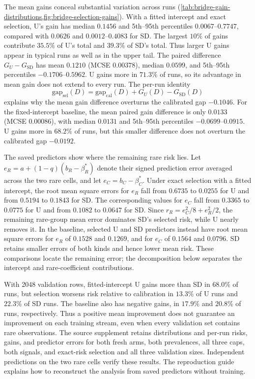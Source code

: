 \documentclass{alt2027}
\begin{document}
The mean gains conceal substantial variation across runs
(\cref{tab:bridge-gain-distributions,fig:bridge-selection-gains}). With a fitted
intercept and exact selection, U's gain has median $0.1456$ and 5th--95th
percentiles $0.0067$--$0.7747$, compared with $0.0626$ and $0.0012$--$0.4083$
for SD. The largest $10\%$ of gains contribute $35.5\%$ of U's total and
$39.3\%$ of SD's total. Thus larger U gains appear in typical runs as well as in
the upper tail. The paired difference $G_U - G_{\mathrm{SD}}$ has mean $0.1210$
(MCSE $0.00378$), median $0.0599$, and 5th--95th percentiles
$-0.1706$--$0.5962$. U gains more in $71.3\%$ of runs, so its advantage in mean
gain does not extend to every run. The per-run identity
\[
  \mathrm{gap}_{\mathrm{sel}}(D) = \mathrm{gap}_{\mathrm{cal}}(D)
                                   + G_U(D)
                                   - G_{\mathrm{SD}}(D)
\]
explains why the mean gain difference overturns the calibrated gap $-0.1046$.
For the fixed-intercept baseline, the mean paired gain difference is only
$0.0133$ (MCSE $0.00086$), with median $0.0131$ and 5th--95th percentiles
$-0.0699$--$0.0915$. U gains more in $68.2\%$ of runs, but this smaller
difference does not overturn the calibrated gap $-0.0192$.

The saved predictors show where the remaining rare risk lies. Let
$e_R = a + (1 - q)(b_R - \beta_R^*)$ denote their signed prediction error
averaged across the two rare cells, and let $e_C = b_C - \beta_C^*$. Under exact
selection with a fitted intercept, the root mean square errors for $e_R$ fall
from $0.6735$ to $0.0255$ for U and from $0.5194$ to $0.1843$ for SD\@. The
corresponding values for $e_C$ fall from $0.3365$ to $0.0775$ for U and from
$0.1082$ to $0.0647$ for SD\@. Since $r_R = e_C^2/8 + e_R^2/2$, the remaining
rare-group mean error dominates SD's selected risk, while U nearly removes it.
In the baseline, selected U and SD predictors instead have root mean square
errors for $e_R$ of $0.1528$ and $0.1269$, and for $e_C$ of $0.1564$ and
$0.0796$. SD retains smaller errors of both kinds and hence lower mean risk.
These comparisons locate the remaining error; the decomposition below separates
the intercept and rare-coefficient contributions.

With 2048 validation rows, fitted-intercept U gains more than SD in $68.0\%$ of
runs, but selection worsens risk relative to calibration in $13.3\%$ of U runs
and $22.3\%$ of SD runs. The baseline also has negative gains, in $17.9\%$ and
$20.8\%$ of runs, respectively. Thus a positive mean improvement does not
guarantee an improvement on each training stream, even when every validation set
contains rare observations. The source supplement retains distributions and
per-run risks, gains, and predictor errors for both fresh arms, both
prevalences, all three caps, both signals, and exact-risk selection and all
three validation sizes. Independent predictions on the two rare cells verify
these results. The reproduction guide explains how to reconstruct the analysis
from saved predictors without training.
\end{document}
